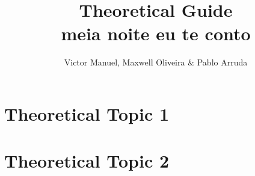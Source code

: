 \documentclass[10pt, twocolumn]{article}
\title{\vspace{-2cm}\textbf{Theoretical Guide\\meia noite eu te conto}}
\author{Victor Manuel, Maxwell Oliveira $\&$ Pablo Arruda}
\affil{\textit{Thanks to UFMG - Humuhumunukunukuapua'a}}
\date{}
\begin{document}
\maketitle\section{Theoretical Topic 1}


\section{Theoretical Topic 2}


\end{document}
